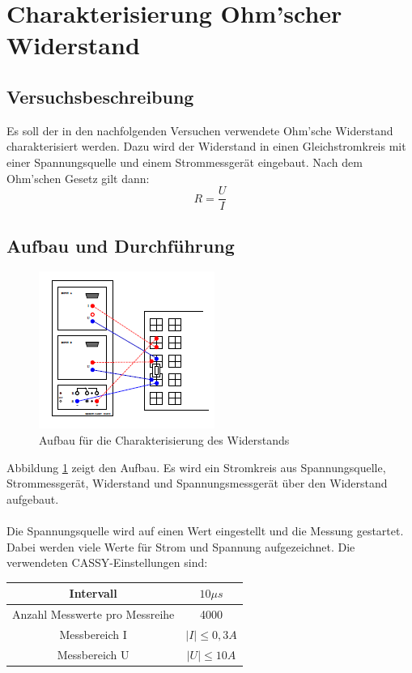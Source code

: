 \documentclass[12pt,a4paper]{article}
\author{Tim}
\begin{document}
\tableofcontents
\newpage

\section{Charakterisierung Ohm'scher Widerstand}
\subsection{Versuchsbeschreibung}
Es soll der in den nachfolgenden Versuchen verwendete Ohm'sche Widerstand charakterisiert werden. Dazu wird der Widerstand in einen Gleichstromkreis mit einer Spannungsquelle und einem Strommessgerät eingebaut. Nach dem Ohm'schen Gesetz gilt dann:
\begin{equation}
R = \dfrac{U}{I}
\label{eq:Ohm}
\end{equation}
\subsection{Aufbau und Durchführung}
\begin{figure}
\begin{center}
\includegraphics[scale=1.2]{Bilder/Charakterisierung_Widerstand_Aufbau.PNG}
\end{center}
\caption[Widerstand Schaltung]{Aufbau für die Charakterisierung des Widerstands}
\label{fig:Widerstand_Aufbau}
\end{figure}
Abbildung \ref{fig:Widerstand_Aufbau} zeigt den Aufbau. Es wird ein Stromkreis aus Spannungsquelle, Strommessgerät, Widerstand und Spannungsmessgerät über den Widerstand aufgebaut.\\
\\ Die Spannungsquelle wird auf einen Wert eingestellt und die Messung gestartet. Dabei werden viele Werte für Strom und Spannung aufgezeichnet. Die verwendeten CASSY-Einstellungen sind:\\
\begin{center}
\begin{tabular}{|c|c|}

\hline 
Intervall & $10 \mu s$ \\ 
\hline 
Anzahl Messwerte pro Messreihe & 4000 \\ 
\hline 
Messbereich I & $|I| \leq 0,3A$ \\ 
\hline 
Messbereich U & $|U| \leq 10A$ \\ 
\hline 

\end{tabular} 
\end{center}
\end{document}

